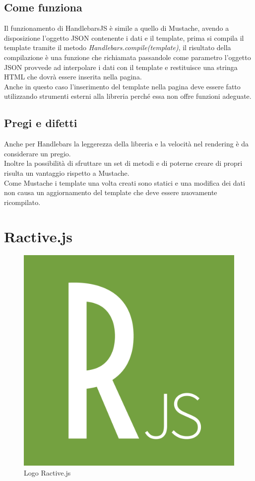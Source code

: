 \subsection{Come funziona}
Il funzionamento di HandlebarsJS è simile a quello di Mustache, avendo a disposizione l'oggetto JSON contenente i dati e il template, prima si compila il template tramite il metodo \textit{Handlebars.compile(template)}, il risultato della compilazione è una funzione che richiamata passandole come parametro l'oggetto JSON provvede ad interpolare i dati con il template e restituisce una stringa HTML che dovrà essere inserita nella pagina.\\
Anche in questo caso l'inserimento del template nella pagina deve essere fatto utilizzando strumenti esterni alla libreria perché essa non offre funzioni adeguate.

\subsection{Pregi e difetti}
Anche per Handlebars la leggerezza della libreria e la velocità nel rendering è da considerare un pregio.\\
Inoltre la possibilità di sfruttare un set di metodi e di poterne creare di propri risulta un vantaggio rispetto a Mustache.\\
Come Mustache i template una volta creati sono statici e una modifica dei dati non causa un aggiornamento del template che deve essere nuovamente ricompilato.
\newpage
\FloatBarrier
\section{Ractive.js}

\begin{figure}[htp]
	\centering
	\includegraphics[width=\textwidth/3]{../immagini/ractive_logo2}
	\caption{Logo Ractive.js}
\end{figure}

